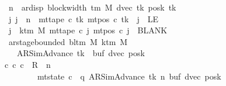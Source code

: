 \begin{isabellebody}
\ \ \ \ \ \ \ \ \ \ \ \ \ \ \ \ \ \ \ \ n\ {\isacharless}{\kern0pt}\ ar{\isacharunderscore}{\kern0pt}disp\ {\isacharparenleft}{\kern0pt}block{\isacharunderscore}{\kern0pt}width\ {\isacharparenleft}{\kern0pt}{\isasymGamma}{\isacharunderscore}{\kern0pt}tm\ M{\isacharparenright}{\kern0pt}{\isacharparenright}{\kern0pt}\ {\isacharparenleft}{\kern0pt}dvec\ tk{\isacharparenright}{\kern0pt}\ {\isacharparenleft}{\kern0pt}posk\ tk{\isacharparenright}{\kern0pt}{\isacharsemicolon}{\kern0pt}\isanewline
\ \ \ \ \ \ \ \ \ \ \ \ \ \ \ \ \ \ \ \ {\isasymAnd}j{\isachardot}{\kern0pt}\ j\ {\isacharless}{\kern0pt}\ n\ {\isasymLongrightarrow}\ mt{\isacharunderscore}{\kern0pt}tape\ c{}{\isacharprime}{\kern0pt}\ tk\ {\isacharparenleft}{\kern0pt}mt{\isacharunderscore}{\kern0pt}pos\ c{}{\isacharprime}{\kern0pt}\ tk\ {\isacharminus}{\kern0pt}\ j{\isacharparenright}{\kern0pt}\ {\isasymnoteq}\ LE{}{\isacharsemicolon}{\kern0pt}\isanewline
\ \ \ \ \ \ \ \ \ \ \ \ \ \ \ \ \ \ \ \ {\isasymforall}j\ {\isasymge}\ k{\isacharunderscore}{\kern0pt}tm\ M{\isachardot}{\kern0pt}\ mt{\isacharunderscore}{\kern0pt}tape\ c{}{\isacharprime}{\kern0pt}\ j\ {\isacharparenleft}{\kern0pt}mt{\isacharunderscore}{\kern0pt}pos\ c{}{\isacharprime}{\kern0pt}\ j{\isacharparenright}{\kern0pt}\ {\isacharequal}{\kern0pt}\ BLANK{}{\isacharsemicolon}{\kern0pt}\isanewline
\ \ \ \ \ \ \ \ \ \ \ \ \ \ \ \ \ \ \ \ ar{\isacharunderscore}{\kern0pt}stage{\isacharunderscore}{\kern0pt}bounded\ {\isacharparenleft}{\kern0pt}bl{\isacharunderscore}{\kern0pt}tm\ M{\isacharparenright}{\kern0pt}\ {\isacharparenleft}{\kern0pt}k{\isacharunderscore}{\kern0pt}tm\ M{\isacharparenright}{\kern0pt}\isanewline
\ \ \ \ \ \ \ \ \ \ \ \ \ \ \ \ \ \ \ \ \ \ {\isacharparenleft}{\kern0pt}AR{\isacharunderscore}{\kern0pt}SimAdvance{\isacharcomma}{\kern0pt}\ tk{\isacharcomma}{\kern0pt}\ {}{\isacharcomma}{\kern0pt}\ buf{\isacharcomma}{\kern0pt}\ dvec{\isacharcomma}{\kern0pt}\ posk{\isacharparenright}{\kern0pt}\ {\isasymrbrakk}\isanewline
\ \ \ \ \ \ \ \ \ \ \ \ \ \ \ \ \ \ {\isasymLongrightarrow}\ {\isasymexists}c{\isacharprime}{\kern0pt}{\isachardot}{\kern0pt}\ {\isacharparenleft}{\kern0pt}c{}{\isacharprime}{\kern0pt}{\isacharcomma}{\kern0pt}\ c{\isacharprime}{\kern0pt}{\isacharparenright}{\kern0pt}\ {\isasymin}\ R{\isacharprime}{\kern0pt}\ {\isacharcircum}{\kern0pt}{\isacharcircum}{\kern0pt}\ n\isanewline
\ \ \ \ \ \ \ \ \ \ \ \ \ \ \ \ \ \ \ \ \ \ \ \ \ \ {\isasymand}\ mt{\isacharunderscore}{\kern0pt}state\ c{\isacharprime}{\kern0pt}\ {\isacharequal}{\kern0pt}\ {\isacharparenleft}{\kern0pt}q{\isacharcomma}{\kern0pt}\ AR{\isacharunderscore}{\kern0pt}SimAdvance{\isacharcomma}{\kern0pt}\ tk{\isacharcomma}{\kern0pt}\ n{\isacharcomma}{\kern0pt}\ buf{\isacharcomma}{\kern0pt}\ dvec{\isacharcomma}{\kern0pt}\ posk{\isacharparenright}{\kern0pt}\isanewline

\end{isabellebody}
